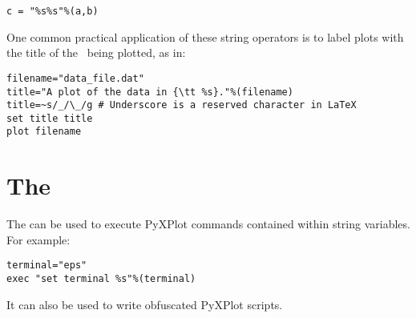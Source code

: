 \begin{verbatim}
c = "%s%s"%(a,b)
\end{verbatim}

One common practical application of these string operators is to label plots
with the title of the \datafile\ being plotted, as in:

\begin{verbatim}
filename="data_file.dat"
title="A plot of the data in {\tt %s}."%(filename)
title=~s/_/\_/g # Underscore is a reserved character in LaTeX
set title title
plot filename
\end{verbatim}

\section{The }

The  can be used to execute PyXPlot commands contained within
string variables. For example:

\begin{verbatim}
terminal="eps"
exec "set terminal %s"%(terminal)
\end{verbatim}

It can also be used to write obfuscated PyXPlot scripts.


